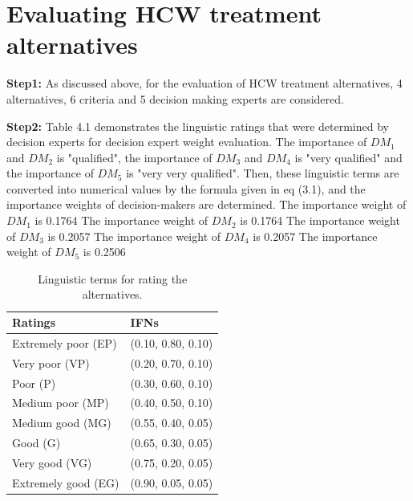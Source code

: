 \begin{flushleft}
\begin{table}[h!]
\begin{tabular}{ p{6cm}|p{3cm}}
    \hline
    \end{tabular}

\label{table:1}
\end{table}
\vspace{0.5cm}
\newline
\section{Evaluating HCW treatment alternatives}

\textbf{Step1:} As discussed above, for the evaluation of HCW treatment alternatives, 4 alternatives, 6 criteria and 5 decision making experts are considered.

\vspace{3mm}

\textbf{Step2:} Table 4.1 demonstrates the linguistic ratings that were determined by decision
experts for decision expert weight evaluation. The importance of $DM_1$ and $DM_2$ is "qualified", the importance of $DM_3$ and $DM_4$ is "very qualified" and the
importance of $DM_5$ is "very very qualified". Then, these linguistic
terms are converted into numerical values by the formula
given in eq (3.1), and the importance
weights of decision-makers are determined.
\newline
The importance weight of $DM_1$ is 0.1764
\newline
The importance weight of $DM_2$ is 0.1764
\newline
The importance weight of $DM_3$ is 0.2057
\newline
The importance weight of $DM_4$ is 0.2057
\newline
The importance weight of $DM_5$ is 0.2506


\renewcommand{\arraystretch}{1}
\begin{table}[h!]
    \centering
  \caption{Linguistic terms for rating the alternatives.}

  \begin{tabular}{ p{6cm}|p{3.3cm}}
 \hline
 
     Ratings & IFNs \\
     \hline
   Extremely poor (EP) & (0.10, 0.80, 0.10)\\
   Very poor (VP) & (0.20, 0.70, 0.10) \\
    Poor (P) &  (0.30, 0.60, 0.10) \\
    Medium poor (MP) & (0.40, 0.50, 0.10)\\
    Medium good (MG)  & (0.55, 0.40, 0.05)\\
   Good (G)  &  (0.65, 0.30, 0.05)\\
    Very good (VG)  & (0.75, 0.20, 0.05)  \\
     Extremely good (EG) & (0.90, 0.05, 0.05) \\
     \hline
     

\end{tabular}
\end{table}
\end{flushleft}
